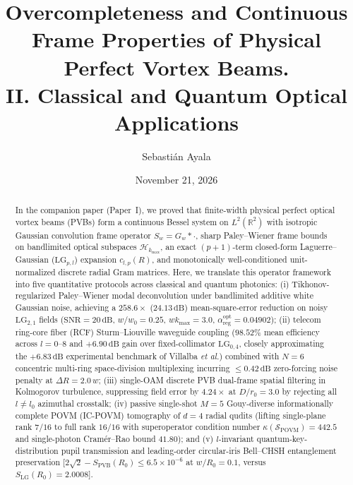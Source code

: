 \documentclass[aps,pra,onecolumn,notitlepage,11pt,tightenlines,nofootinbib,floatfix,longbibliography]{revtex4-2}
\begin{document}
\title{Overcompleteness and Continuous Frame Properties of Physical Perfect Vortex Beams.\\II. Classical and Quantum Optical Applications}

\author{Sebasti\'an Ayala}

\date{November 21, 2026}

\begin{abstract}
In the companion paper (Paper~I), we proved that finite-width physical perfect optical vortex beams (PVBs) form a continuous Bessel system on $L^2(\mathbb{R}^2)$ with isotropic Gaussian convolution frame operator $S_w = G_w * \cdot$, sharp Paley--Wiener frame bounds on bandlimited optical subspaces $\mathcal{H}_{k_{\max}}$, an exact $(p+1)$-term closed-form Laguerre--Gaussian ($\mathrm{LG}_{p,l}$) expansion $c_{l,p}(R)$, and monotonically well-conditioned unit-normalized discrete radial Gram matrices. Here, we translate this operator framework into five quantitative protocols across classical and quantum photonics: (i) Tikhonov-regularized Paley--Wiener modal deconvolution under bandlimited additive white Gaussian noise, achieving a $258.6\times$ ($24.13\,\mathrm{dB}$) mean-square-error reduction on noisy $\mathrm{LG}_{2,1}$ fields ($\mathrm{SNR} = 20\,\mathrm{dB}$, $w/w_0 = 0.25$, $w k_{\max} = 3.0$, $\alpha_{\mathrm{reg}}^{\mathrm{opt}} = 0.04902$); (ii) telecom ring-core fiber (RCF) Sturm--Liouville waveguide coupling ($98.52\%$ mean efficiency across $l = 0\text{--}8$ and $+6.90\,\mathrm{dB}$ gain over fixed-collimator $\mathrm{LG}_{0,4}$, closely approximating the $+6.83\,\mathrm{dB}$ experimental benchmark of Villalba \emph{et al.}) combined with $N = 6$ concentric multi-ring space-division multiplexing incurring $\le 0.42\,\mathrm{dB}$ zero-forcing noise penalty at $\Delta R = 2.0\,w$; (iii) single-OAM discrete PVB dual-frame spatial filtering in Kolmogorov turbulence, suppressing field error by $4.24\times$ at $D/r_0 = 3.0$ by rejecting all $l \neq l_0$ azimuthal crosstalk; (iv) passive single-shot $M = 5$ Gouy-diverse informationally complete POVM (IC-POVM) tomography of $d = 4$ radial qudits (lifting single-plane rank $7/16$ to full rank $16/16$ with superoperator condition number $\kappa(\mathcal{S}_{\mathrm{POVM}}) = 442.5$ and single-photon Cram\'er--Rao bound $41.80$); and (v) $l$-invariant quantum-key-distribution pupil transmission and leading-order circular-iris Bell--CHSH entanglement preservation [$2\sqrt{2} - S_{\mathrm{PVB}}(R_0) \le 6.5\times 10^{-6}$ at $w/R_0 = 0.1$, versus $S_{\mathrm{LG}}(R_0) = 2.0008$].
\end{abstract}
\end{document}
